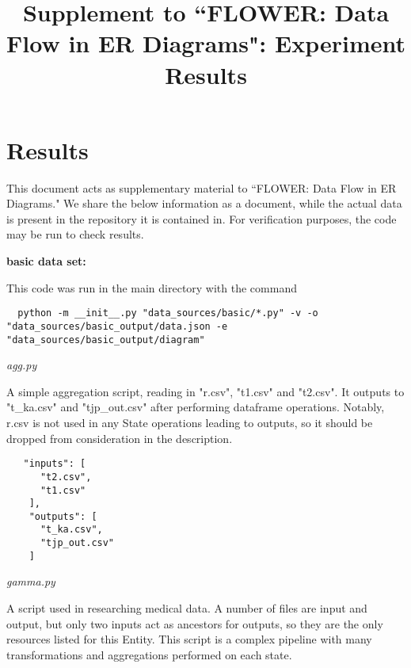 \documentclass{llncs}
\newcommand{\+}{\discretionary{\mbox{${\bm\cdot}\mkern-1mu$}}{}{}}
\begin{document}
\title{Supplement to ``FLOWER: Data Flow in ER Diagrams": Experiment Results}
\author{}
\institute{}
\maketitle


\section{Results}
This document acts as supplementary material to ``FLOWER: Data Flow in ER
Diagrams." We share the below information as a document, while the actual data is present in the repository it is contained in. For verification purposes, the code may be run to check results.


  \textbf{basic data set:}

  This code was run in the main directory with the command 
  
  \begin{lstlisting}
  python -m __init__.py "data_sources/basic/*.py" -v -o "data_sources/basic_output/data.json -e "data_sources/basic_output/diagram"
\end{lstlisting}

\begin{description}
   \item \textit{agg.py}
   \item[Description:] A simple aggregation script, reading in "r.csv", "t1.csv" and "t2.csv". It outputs to "t\_ka.csv" and "tjp\_out.csv" after performing dataframe operations. Notably, r.csv is not used in any State operations leading to outputs, so it should be dropped from consideration in the description.
   \item[Results:] 
\end{description}
\begin{lstlisting}
   "inputs": [
      "t2.csv",
      "t1.csv"
    ],
    "outputs": [
      "t_ka.csv",
      "tjp_out.csv"
    ]
\end{lstlisting}

\begin{description}
   \item \textit{gamma.py}
   \item[Description:] A script used in researching medical data. A number of files are input and output, but only two inputs act as ancestors for outputs, so they are the only resources listed for this Entity. This script is a complex pipeline with many transformations and aggregations performed on each state.
    \item[Results:]
\end{description}
\end{document}
